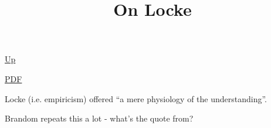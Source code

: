 \documentclass[12pt,a4paper]{report}
\begin{document}
 \href{doc/phil/People/Kant/Quotes.html}{Up} 

 \href{doc/phil/People/Kant/Quotes/OnLocke.pdf}{PDF} 
\title{On Locke}
Locke (i.e. empiricism) offered ``a mere physiology of the understanding''.

Brandom repeats this a lot - what's the quote from?
\end{document}
